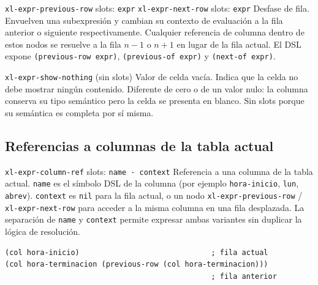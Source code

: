 \documentclass[12pt,a4paper]{report}
\begin{document}
\vspace{0.5em}

\begin{nodobox}{\texttt{xl-expr-previous-row} \quad \small\textmd{slots:} \texttt{expr} \qquad\qquad \texttt{xl-expr-next-row} \quad \small\textmd{slots:} \texttt{expr}}
Desfase de fila. Envuelven una subexpresión y cambian su contexto de evaluación a la fila anterior o siguiente respectivamente. Cualquier referencia de columna dentro de estos nodos se resuelve a la fila $n-1$ o $n+1$ en lugar de la fila actual. El DSL expone \texttt{(previous-row expr)}, \texttt{(previous-of expr)} y \texttt{(next-of expr)}.
\end{nodobox}

\vspace{0.5em}

\begin{nodobox}{\texttt{xl-expr-show-nothing} \quad \small\textmd{(sin slots)}}
Valor de celda vacía. Indica que la celda no debe mostrar ningún contenido. Diferente de cero o de un valor nulo: la columna conserva su tipo semántico pero la celda se presenta en blanco. Sin slots porque su semántica es completa por sí misma.
\end{nodobox}

\subsection{Referencias a columnas de la tabla actual}

\begin{nodobox}{\texttt{xl-expr-column-ref} \quad \small\textmd{slots:} \texttt{name · context}}
Referencia a una columna de la tabla actual. \texttt{name} es el símbolo DSL de la columna (por ejemplo \texttt{hora-inicio}, \texttt{lun}, \texttt{abrev}). \texttt{context} es \texttt{nil} para la fila actual, o un nodo \texttt{xl-expr-previous-row} / \texttt{xl-expr-next-row} para acceder a la misma columna en una fila desplazada. La separación de \texttt{name} y \texttt{context} permite expresar ambas variantes sin duplicar la lógica de resolución.

\begin{lstlisting}
(col hora-inicio)                              ; fila actual
(col hora-terminacion (previous-row (col hora-terminacion)))
                                               ; fila anterior
\end{lstlisting}
\end{nodobox}
\end{document}
